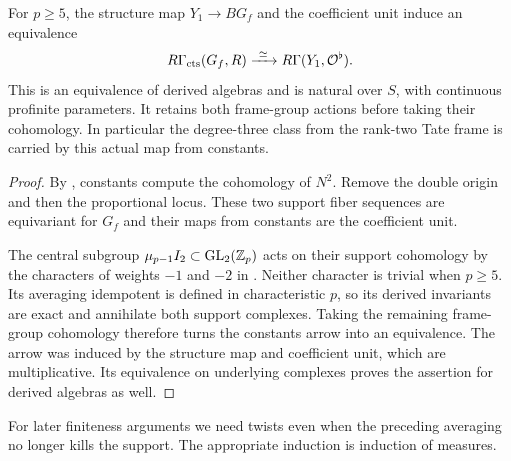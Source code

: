 \begin{proposition}\label{h3:prop:ordinary-constants}
For $p\geq5$, the structure map $Y_1\to BG_f$ and the
coefficient unit induce an equivalence
\[
 R\Gamma_{\mathrm{cts}}(G_f,R)
   \xrightarrow{\ \simeq\ }
 R\Gamma(Y_1,\mathcal O^\flat).
\]
This is an equivalence of derived algebras and is natural
over $S$, with continuous profinite parameters.  It retains
both frame-group actions before taking their cohomology.
In particular the degree-three class from the rank-two
Tate frame is carried by this actual map from constants.
\end{proposition}
\begin{proof}
By , constants
compute the cohomology of $N^2$.  Remove the double origin
and then the proportional locus.  These two support fiber
sequences are equivariant for $G_f$ and their maps from
constants are the coefficient unit.

The central subgroup $\mu_{p-1}I_2\subset\operatorname{GL}_2(\mathbb Z_p)$
acts on their support cohomology by the characters of
weights $-1$ and $-2$ in .
Neither character is trivial when $p\geq5$.  Its averaging
idempotent is defined in characteristic $p$, so its derived
invariants are exact and annihilate both support complexes.
Taking the remaining frame-group cohomology therefore
turns the constants arrow into an equivalence.
The arrow was induced by the structure map and coefficient
unit, which are multiplicative.  Its equivalence on
underlying complexes proves the assertion for derived
algebras as well.
\end{proof}

For later finiteness arguments we need twists even when
the preceding averaging no longer kills the support.
The appropriate induction is induction of measures.


